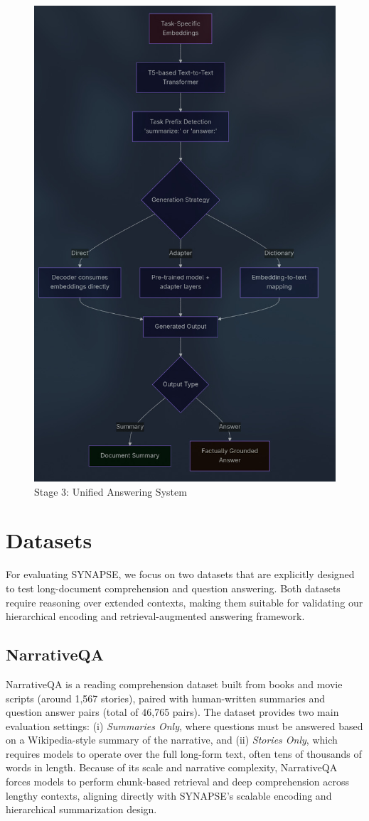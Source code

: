 \documentclass[11pt]{article}
\begin{document}
\begin{figure}[H]
    \centering
    \includegraphics[width=0.6\columnwidth]{assets/Stage_3.jpeg}
    \caption*{Stage 3: Unified Answering System}
    \label{fig:stage2}
\end{figure}

\section{Datasets}
For evaluating SYNAPSE, we focus on two datasets that are explicitly designed to test long-document comprehension and question answering. Both datasets require reasoning over extended contexts, making them suitable for validating our hierarchical encoding and retrieval-augmented answering framework.

\subsection{NarrativeQA}
NarrativeQA \citep{kočiský2017narrativeqareadingcomprehensionchallenge} is a reading comprehension dataset built from books and movie scripts (around 1,567 stories), paired with human-written summaries and question answer pairs (total of 46,765 pairs). The dataset provides two main evaluation settings: (i) \textit{Summaries Only}, where questions must be answered based on a Wikipedia-style summary of the narrative, and (ii) \textit{Stories Only}, which requires models to operate over the full long-form text, often tens of thousands of words in length. Because of its scale and narrative complexity, NarrativeQA forces models to perform chunk-based retrieval and deep comprehension across lengthy contexts, aligning directly with SYNAPSE's scalable encoding and hierarchical summarization design.
\end{document}
